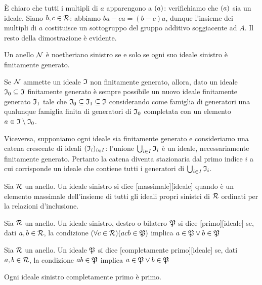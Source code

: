 \Proof \`E chiaro che tutti i multipli di $a$ apparengono a $\left ( a \right )$: verifichiamo che $\left ( a \right )$ sia un ideale. Siano $b, c \in \mathcal{R}$: abbiamo $ba - ca = (b - c)a$, dunque l'insieme dei multipli di $a$ costituisce un sottogruppo del gruppo additivo soggiacente ad $A$. Il resto della dimostrazione \`e evidente. \EndProof
\begin{Theorem}
	Un anello $\mathcal{N}$ \`e noetheriano sinistro se e solo se ogni suo ideale sinistro \`e finitamente generato.
\end{Theorem}
\Proof Se $\mathcal{N}$ ammette un ideale $\mathfrak{I}$ non finitamente generato, allora, dato un ideale $\mathfrak{I}_0 \subseteq \mathfrak{I}$ finitamente generato \`e sempre possibile un nuovo ideale finitamente generato $\mathfrak{I}_1$ tale che $\mathfrak{I}_0 \subseteq \mathfrak{I}_1 \subseteq \mathfrak{I}$ considerando come famiglia di generatori una qualunque famiglia finita di generatori di $\mathfrak{I}_0$ completata con un elemento $a \in \mathfrak{I} \setminus \mathfrak{I}_0$.
\par Viceversa, supponiamo ogni ideale sia finitamente generato e consideriamo una catena crescente di ideali $(\mathfrak{I}_i)_{i \in I}$: l'unione $\bigcup_{i \in I} \mathfrak{I}_i$ \`e un ideale, necessariamente finitamente generato. Pertanto la catena diventa stazionaria dal primo indice $i$ a cui corrisponde un ideale che contiene tutti i generatori di $\bigcup_{i \in I} \mathfrak{I}_i$. \EndProof
\begin{Definition}
	Sia $\mathcal{R}$ un anello. Un ideale sinistro si dice [massimale][ideale] quando \`e un elemento massimale dell'insieme di tutti gli ideali propri sinistri di $\mathcal{R}$ ordinati per la relazioni d'inclusione.
\end{Definition}
\begin{Definition}
	Sia $\mathcal{R}$ un anello. Un ideale sinistro, destro o bilatero $\mathfrak{P}$ si dice [primo][ideale] se, dati $a, b \in \mathcal{R}$, la condizione $(\forall c \in \mathcal{R})(acb \in \mathfrak{P})$ implica $a \in \mathfrak{P} \vee b \in \mathfrak{P}$
\end{Definition}
\begin{Definition}
	Sia $\mathcal{R}$ un anello. Un ideale $\mathfrak{P}$ si dice [completamente primo][ideale] se, dati $a, b \in \mathcal{R}$, la condizione $ab \in \mathfrak{P}$ implica $a \in \mathfrak{P} \vee b \in \mathfrak{P}$
\end{Definition}
\begin{Theorem}
	Ogni ideale sinistro completamente primo \`e primo.
\end{Theorem}
